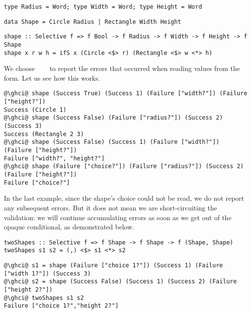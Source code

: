 {\vspace{1mm}
\begin{verbatim}
type Radius = Word; type Width = Word; type Height = Word
\end{verbatim}
\vspace{1mm}
\begin{verbatim}
data Shape = Circle Radius | Rectangle Width Height
\end{verbatim}
\vspace{1mm}
\begin{verbatim}
shape :: Selective f => f Bool -> f Radius -> f Width -> f Height -> f Shape
shape x r w h = ifS x (Circle <$> r) (Rectangle <$> w <*> h)
\end{verbatim}
\vspace{1mm}

\noindent
We choose ~\hs{=}~~\hs{[String]} to report the errors that
occurred when reading values from the form. Let us see how this works.

\vspace{1mm}
\begin{verbatim}
@\ghci@ shape (Success True) (Success 1) (Failure ["width?"]) (Failure ["height?"])
Success (Circle 1)
@\ghci@ shape (Success False) (Failure ["radius?"]) (Success 2) (Success 3)
Success (Rectangle 2 3)
@\ghci@ shape (Success False) (Success 1) (Failure ["width?"]) (Failure ["height?"])
Failure ["width?", "height?"]
@\ghci@ shape (Failure ["choice?"]) (Failure ["radius?"]) (Success 2) (Failure ["height?"])
Failure ["choice?"]
\end{verbatim}
\vspace{1mm}

\noindent
In the last example, since the shape's choice could not be read, we do not
report any subsequent errors. But it does not mean we are short-circuiting the
validation: we will continue accumulating errors as soon as we get out of the
opaque conditional, as demonstrated below.

\vspace{1mm}
\begin{verbatim}
twoShapes :: Selective f => f Shape -> f Shape -> f (Shape, Shape)
twoShapes s1 s2 = (,) <$> s1 <*> s2
\end{verbatim}
\vspace{1mm}
\begin{verbatim}
@\ghci@ s1 = shape (Failure ["choice 1?"]) (Success 1) (Failure ["width 1?"]) (Success 3)
@\ghci@ s2 = shape (Success False) (Success 1) (Success 2) (Failure ["height 2?"])
@\ghci@ twoShapes s1 s2
Failure ["choice 1?","height 2?"]
\end{verbatim}
\vspace{1mm}

}

